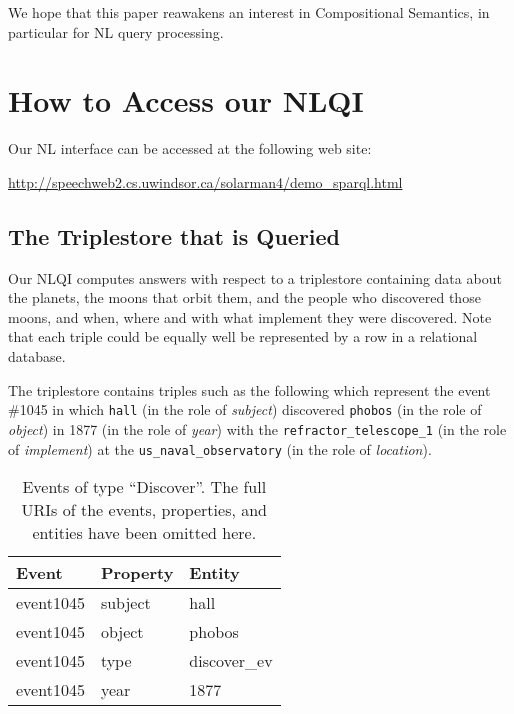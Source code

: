 \documentclass[../main.tex]{subfiles}
\begin{document}
\begin{refsection}
We hope that this paper reawakens an interest in Compositional Semantics, in particular for NL query processing.

\section{How to Access our NLQI}
\label{webist2019conf:access}

Our NL interface can be accessed at the following web site:

\begin{center}
	\url{http://speechweb2.cs.uwindsor.ca/solarman4/demo_sparql.html}
\end{center}

\subsection{The Triplestore that is Queried}
\label{webist2019conf:triplestore}
Our NLQI computes answers with respect to a triplestore containing data about the planets, the moons that orbit them, and the people who discovered those moons, and when, where and with what implement they were discovered. Note that each triple could be equally well be represented by a row in a relational database.

The triplestore contains triples such as the following which represent the event \#1045 in which \texttt{hall} (in the role of \textit{subject}) discovered \texttt{phobos} (in the role of \textit{object}) in 1877 (in the role of \textit{year}) with the \texttt{refractor\_telescope\_1} (in the role of \textit{implement})  at the \texttt{us\_naval\_observatory} (in the role of \textit{location}).

\begin{table}[h]
	\caption{Events of type ``Discover''. The full URIs of the events, properties, and entities have been omitted here.}
	\label{webist2019conf:evdiscover}
	\centering
	\begin{tabular}{lll}
		\toprule
		Event & Property & Entity \\
		\midrule
		event1045 &
		subject &
		hall \\
		
		event1045 &
		object &
		phobos \\
		
		event1045 &
		type &
		discover\_ev \\
		
		event1045 &
		year &
		1877 \\
		

\end{tabular}
\end{table}
\end{refsection}
\end{document}
